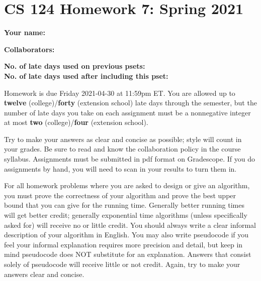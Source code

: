 \documentclass[11pt]{article}
\begin{document}
	
	\section*{CS 124 Homework 7: Spring 2021}
 		
	\textbf{Your name:} 
		
	\textbf{Collaborators:} 

	\textbf{No. of late days used on previous psets: }\\
	\textbf{No. of late days used after including this pset: }

Homework is due Friday 2021-04-30 at 11:59pm ET. You are allowed up to {\bf twelve} (college)/{\bf forty} (extension school) late days through the semester, but the number of late days you take on each assignment must be a nonnegative integer at most {\bf two} (college)/{\bf four} (extension school).

Try to make your answers as clear and concise as possible;
style will count in your grades. Be sure to read and know the collaboration policy in the course
syllabus. Assignments must be submitted in pdf format on Gradescope. If you do assignments by hand, you
will need to scan in your results to turn them in. 

For all homework problems where you are asked to design or give an algorithm, you must prove the correctness
of your algorithm and prove the best upper bound that you can give for the running time. Generally
better running times will get better credit; generally exponential time algorithms (unless specifically asked
for) will receive no or little credit. You should always write a clear informal description of your algorithm
in English. You may also write pseudocode if you feel your informal explanation requires more precision
and detail, but keep in mind pseudocode does NOT substitute for an explanation. Answers that consist
solely of pseudocode will receive little or not credit. Again, try to make your answers clear and concise.
\end{document}
